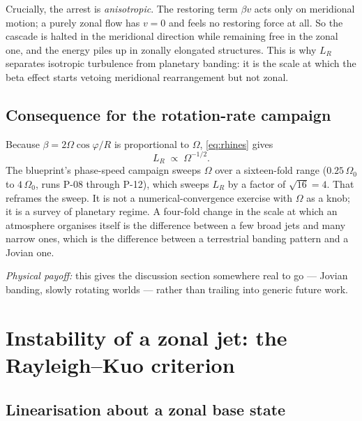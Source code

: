 \documentclass[11pt,a4paper]{article}
\begin{document}
Crucially, the arrest is \emph{anisotropic}. The restoring term $\beta v$ acts
only on meridional motion; a purely zonal flow has $v = 0$ and feels no
restoring force at all. So the cascade is halted in the meridional direction
while remaining free in the zonal one, and the energy piles up in zonally
elongated structures. This is why $L_R$ separates isotropic turbulence from
planetary banding: it is the scale at which the beta effect starts vetoing
meridional rearrangement but not zonal.

\subsection{Consequence for the rotation-rate campaign}

Because $\beta = 2\Omega\cos\varphi/R$ is proportional to $\Omega$,
\eqref{eq:rhines} gives
%
\begin{equation}
L_R \;\propto\; \Omega^{-1/2} .
\label{eq:rhinesomega}
\end{equation}
%
The blueprint's phase-speed campaign sweeps $\Omega$ over a sixteen-fold range
($0.25\,\Omega_0$ to $4\,\Omega_0$, runs P-08 through P-12), which sweeps $L_R$
by a factor of $\sqrt{16} = 4$. That reframes the sweep. It is not a
numerical-convergence exercise with $\Omega$ as a knob; it is a survey of
planetary regime. A four-fold change in the scale at which an atmosphere
organises itself is the difference between a few broad jets and many narrow
ones, which is the difference between a terrestrial banding pattern and a Jovian
one.

\medskip
\noindent\emph{Physical payoff:} this gives the discussion section somewhere real
to go --- Jovian banding, slowly rotating worlds --- rather than trailing into
generic future work.

\section{Instability of a zonal jet: the Rayleigh--Kuo criterion}
\label{sec:rayleighkuo}

\subsection{Linearisation about a zonal base state}
\end{document}
